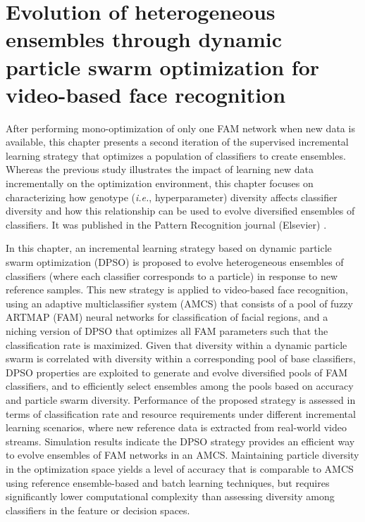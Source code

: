 \chapter{Evolution of heterogeneous ensembles through dynamic particle swarm optimization for video-based face recognition}

After performing mono-optimization of only one FAM network when new data is available, this chapter presents a second iteration of the supervised incremental learning strategy that optimizes a population of classifiers to create ensembles.
Whereas the previous study illustrates the impact of learning new data incrementally on the optimization environment, this chapter focuses on characterizing how genotype (\emph{i.e.}, hyperparameter) diversity affects classifier diversity and how this relationship can be used to evolve diversified ensembles of classifiers.
It was published in the Pattern Recognition journal (Elsevier) \cite{connolly11}. 

In this chapter, an incremental learning strategy based on dynamic particle swarm optimization (DPSO) is proposed to evolve heterogeneous ensembles of classifiers (where each classifier corresponds to a particle) in response to new reference samples.
This new strategy is applied to video-based face recognition, using an adaptive multiclassifier system (AMCS) that consists of a pool of fuzzy ARTMAP (FAM) neural networks for classification of facial regions, and a niching version of DPSO that optimizes all FAM parameters such that the classification rate is maximized.
Given that diversity within a dynamic particle swarm is correlated with diversity within a corresponding pool of base classifiers, DPSO properties are exploited to generate and evolve diversified pools of FAM classifiers, and to efficiently select ensembles among the pools based on accuracy and particle swarm diversity.
Performance of the proposed strategy is assessed in terms of classification rate and resource requirements under different incremental learning scenarios, where new reference data is extracted from real-world video streams.
Simulation results indicate the DPSO strategy provides an efficient way to evolve ensembles of FAM networks in an AMCS.
Maintaining particle diversity in the optimization space yields a level of accuracy that is comparable to AMCS using reference ensemble-based and batch learning techniques, but requires significantly lower computational complexity than assessing diversity among classifiers in the feature or decision spaces.

